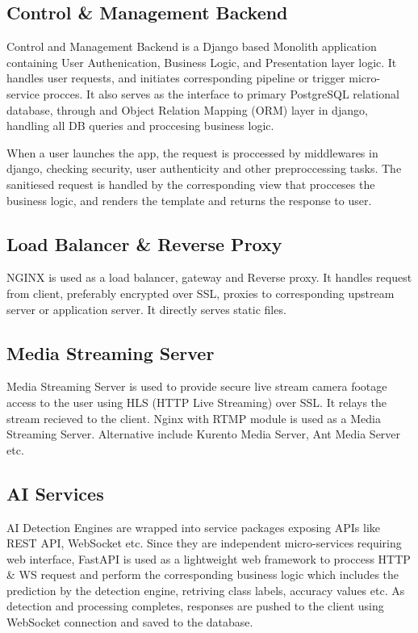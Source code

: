 \subsection{Control \& Management Backend}
Control and Management Backend is a Django based Monolith application containing User Authenication, Business Logic, and Presentation layer logic. It handles user requests, and initiates corresponding pipeline or trigger micro-service procces. It also serves as the interface to primary PostgreSQL relational database, through and Object Relation Mapping (ORM) layer in django, handling all DB queries and proccesing business logic.

When a user launches the app, the request is proccessed by middlewares in django, checking security, user authenticity and other preproccessing tasks. The sanitiesed request is handled by the corresponding view that procceses the business logic, and renders the template and returns the response to user.

\subsection{Load Balancer \& Reverse Proxy}
NGINX is used as a load balancer, gateway and Reverse proxy. It handles request from client, preferably encrypted over SSL, proxies to corresponding upstream server or application server. It directly serves static files.

\subsection{Media Streaming Server}
Media Streaming Server is used to provide secure live stream camera footage access to the user using HLS (HTTP Live Streaming) over SSL. It relays the stream recieved to the client. Nginx with RTMP module is used as a Media Streaming Server. Alternative include Kurento Media Server, Ant Media Server etc.

\subsection{AI Services}
AI Detection Engines are wrapped into service packages exposing APIs like REST API, WebSocket etc. Since they are independent micro-services requiring web interface, FastAPI is used as a lightweight web framework to proccess HTTP \& WS request and perform the corresponding business logic which includes the prediction by the detection engine, retriving class labels, accuracy values etc. As detection and processing completes, responses are pushed to the client using WebSocket connection and saved to the database.

